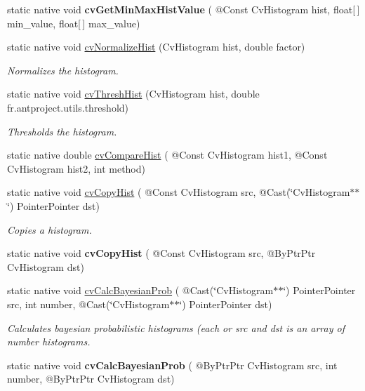 \begin{DoxyCompactItemize}
static native void {\bfseries cv\+Get\+Min\+Max\+Hist\+Value} ( @Const Cv\+Histogram hist, float\mbox{[}$\,$\mbox{]} min\+\_\+value, float\mbox{[}$\,$\mbox{]} max\+\_\+value)
\item 
static native void \hyperlink{group__imgproc__c_gaae040215ddf5f0582fd04464ea27495f}{cv\+Normalize\+Hist} (Cv\+Histogram hist, double factor)
\begin{DoxyCompactList}\small\item\em Normalizes the histogram. \end{DoxyCompactList}\item 
static native void \hyperlink{group__imgproc__c_ga1c1fb991e209c208c788ade579aacc5a}{cv\+Thresh\+Hist} (Cv\+Histogram hist, double fr.antproject.utils.threshold)
\begin{DoxyCompactList}\small\item\em Thresholds the histogram. \end{DoxyCompactList}\item 
static native double \hyperlink{group__imgproc__c_gae639bb492f6f6f8434a3bf4a6ae085c9}{cv\+Compare\+Hist} ( @Const Cv\+Histogram hist1, @Const Cv\+Histogram hist2, int method)
\item 
static native void \hyperlink{group__imgproc__c_ga8d6e92f294d7853bc6a9435443b56c5d}{cv\+Copy\+Hist} ( @Const Cv\+Histogram src, @Cast(\char`\"{}Cv\+Histogram$\ast$$\ast$\char`\"{}) Pointer\+Pointer dst)
\begin{DoxyCompactList}\small\item\em Copies a histogram. \end{DoxyCompactList}\item 
static native void {\bfseries cv\+Copy\+Hist} ( @Const Cv\+Histogram src, @By\+Ptr\+Ptr Cv\+Histogram dst)
\item 
static native void \hyperlink{group__imgproc__c_ga2c80ef0ae6c6bdbe45649905b8c8e462}{cv\+Calc\+Bayesian\+Prob} ( @Cast(\char`\"{}Cv\+Histogram$\ast$$\ast$\char`\"{}) Pointer\+Pointer src, int number, @Cast(\char`\"{}Cv\+Histogram$\ast$$\ast$\char`\"{}) Pointer\+Pointer dst)
\begin{DoxyCompactList}\small\item\em Calculates bayesian probabilistic histograms (each or src and dst is an array of {\itshape number} histograms. \end{DoxyCompactList}\item 
static native void {\bfseries cv\+Calc\+Bayesian\+Prob} ( @By\+Ptr\+Ptr Cv\+Histogram src, int number, @By\+Ptr\+Ptr Cv\+Histogram dst)
$$
\end{DoxyCompactItemize}

